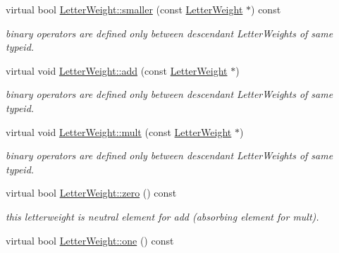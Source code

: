 \begin{DoxyCompactItemize}
\mbox{\label{group__weight_ga0ef9dd9bcd765c0e3c50b384b34d88d2}} 
virtual bool \mbox{\hyperlink{group__weight_ga0ef9dd9bcd765c0e3c50b384b34d88d2}{Letter\+Weight\+::smaller}} (const \mbox{\hyperlink{classLetterWeight}{Letter\+Weight}} $\ast$) const
\begin{DoxyCompactList}\small\item\em binary operators are defined only between descendant Letter\+Weights of same typeid. \end{DoxyCompactList}\item 
\mbox{\label{group__weight_ga49b09c8f364a2ebf1d154f606d9aaea8}} 
virtual void \mbox{\hyperlink{group__weight_ga49b09c8f364a2ebf1d154f606d9aaea8}{Letter\+Weight\+::add}} (const \mbox{\hyperlink{classLetterWeight}{Letter\+Weight}} $\ast$)
\begin{DoxyCompactList}\small\item\em binary operators are defined only between descendant Letter\+Weights of same typeid. \end{DoxyCompactList}\item 
\mbox{\label{group__weight_gad1208e74e54ca8fc2f361e6fc106df01}} 
virtual void \mbox{\hyperlink{group__weight_gad1208e74e54ca8fc2f361e6fc106df01}{Letter\+Weight\+::mult}} (const \mbox{\hyperlink{classLetterWeight}{Letter\+Weight}} $\ast$)
\begin{DoxyCompactList}\small\item\em binary operators are defined only between descendant Letter\+Weights of same typeid. \end{DoxyCompactList}\item 
\mbox{\label{group__weight_gabaad113da06b47c4b291558d05da6aa6}} 
virtual bool \mbox{\hyperlink{group__weight_gabaad113da06b47c4b291558d05da6aa6}{Letter\+Weight\+::zero}} () const
\begin{DoxyCompactList}\small\item\em this letterweight is neutral element for add (absorbing element for mult). \end{DoxyCompactList}\item 
\mbox{\label{group__weight_ga53200866c20ae5e4aae7ab8acd8f3ad0}} 
virtual bool \mbox{\hyperlink{group__weight_ga53200866c20ae5e4aae7ab8acd8f3ad0}{Letter\+Weight\+::one}} () const

\end{DoxyCompactItemize}
